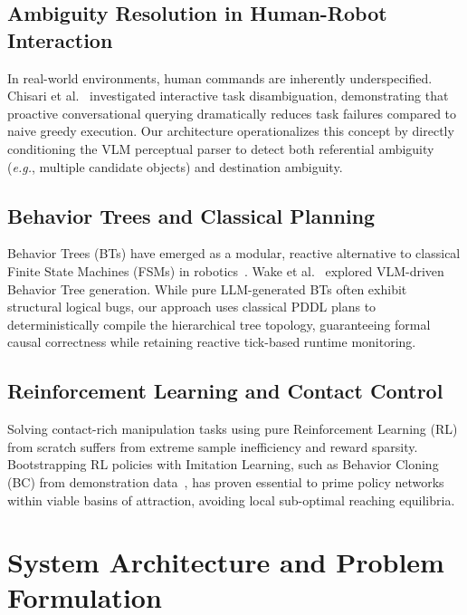 \documentclass[conference]{IEEEtran}
\begin{document}
\subsection{Ambiguity Resolution in Human-Robot Interaction}
In real-world environments, human commands are inherently underspecified. Chisari et al.~\cite{chisari2025robotic} investigated interactive task disambiguation, demonstrating that proactive conversational querying dramatically reduces task failures compared to naive greedy execution. Our architecture operationalizes this concept by directly conditioning the VLM perceptual parser to detect both referential ambiguity (\textit{e.g.}, multiple candidate objects) and destination ambiguity.

\subsection{Behavior Trees and Classical Planning}
Behavior Trees (BTs) have emerged as a modular, reactive alternative to classical Finite State Machines (FSMs) in robotics~\cite{colledanchise2018behavior}. Wake et al.~\cite{wake2025vlm} explored VLM-driven Behavior Tree generation. While pure LLM-generated BTs often exhibit structural logical bugs, our approach uses classical PDDL plans to deterministically compile the hierarchical tree topology, guaranteeing formal causal correctness while retaining reactive tick-based runtime monitoring.

\subsection{Reinforcement Learning and Contact Control}
Solving contact-rich manipulation tasks using pure Reinforcement Learning (RL) from scratch suffers from extreme sample inefficiency and reward sparsity. Bootstrapping RL policies with Imitation Learning, such as Behavior Cloning (BC) from demonstration data~\cite{schulman2017proximal}, has proven essential to prime policy networks within viable basins of attraction, avoiding local sub-optimal reaching equilibria.

\section{System Architecture and Problem Formulation}
\label{sec:system_architecture}
\end{document}
